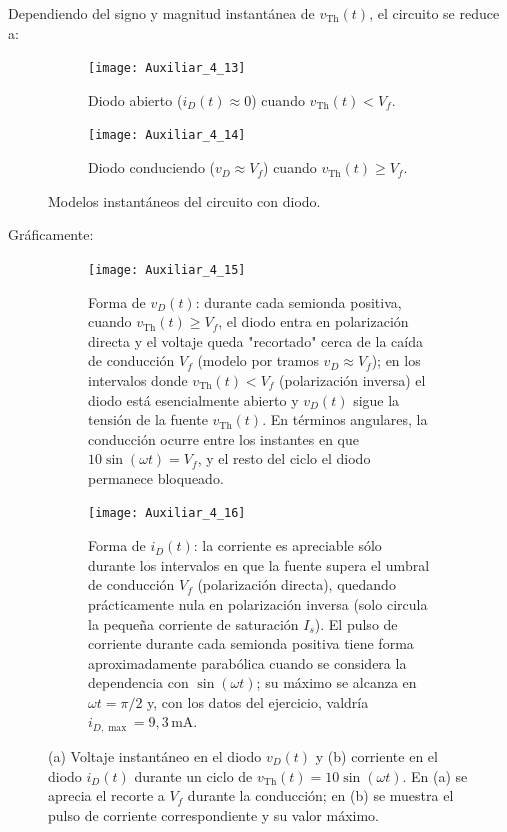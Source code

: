 \documentclass[
  11pt,
  letterpaper,
   addpoints,
   answers
  ]{exam}
\begin{document}
\begin{questions}
\begin{solution}
\noindent Dependiendo del signo y magnitud instantánea de $v_{\text{Th}}(t)$, el circuito se reduce a:
\begin{figure}[H]
  \centering
  \begin{subfigure}[b]{0.45\textwidth}
    \centering
    \texttt{[image: Auxiliar\_4\_13]}
    \caption{Diodo abierto ($i_D(t)\approx 0$) cuando $v_{\text{Th}}(t)<V_f$.}
    \label{fig:diodo-abierto}
  \end{subfigure}\hfill
  \begin{subfigure}[b]{0.4\textwidth}
    \centering
    \texttt{[image: Auxiliar\_4\_14]}
    \caption{Diodo conduciendo ($v_D\approx V_f$) cuando $v_{\text{Th}}(t)\ge V_f$.}
    \label{fig:diodo-conduce}
  \end{subfigure}
  \caption{Modelos instantáneos del circuito con diodo.}
  \label{fig:diodo-operacion-casos}
\end{figure}
Gráficamente:
\begin{figure}[H]
  \centering
  \begin{subfigure}[b]{0.48\textwidth}
    \centering
    \texttt{[image: Auxiliar\_4\_15]}
    \caption{Forma de $v_D(t)$: durante cada semionda positiva, cuando $v_{\text{Th}}(t)\ge V_f$, el diodo entra en polarización directa y el voltaje queda "recortado" cerca de la caída de conducción $V_f$ (modelo por tramos $v_D\approx V_f$); en los intervalos donde $v_{\text{Th}}(t)<V_f$ (polarización inversa) el diodo está esencialmente abierto y $v_D(t)$ sigue la tensión de la fuente $v_{\text{Th}}(t)$. En términos angulares, la conducción ocurre entre los instantes en que $10\sin(\omega t)=V_f$, y el resto del ciclo el diodo permanece bloqueado.}
    \label{fig:voltaje-corriente-diodo}
  \end{subfigure}\hfill
  \begin{subfigure}[b]{0.48\textwidth}
    \centering
    \texttt{[image: Auxiliar\_4\_16]}
    \caption{Forma de $i_D(t)$: la corriente es apreciable sólo durante los intervalos en que la fuente supera el umbral de conducción $V_f$ (polarización directa), quedando prácticamente nula en polarización inversa (solo circula la pequeña corriente de saturación $I_s$). El pulso de corriente durante cada semionda positiva tiene forma aproximadamente parabólica cuando se considera la dependencia con $\sin(\omega t)$; su máximo se alcanza en $\omega t=\pi/2$ y, con los datos del ejercicio, valdría $i_{D,\max}=9{,}3\,$mA.}
    \label{fig:voltaje-corriente-diodo-detalle}
  \end{subfigure}
  \caption{(a) Voltaje instantáneo en el diodo $v_D(t)$ y (b) corriente en el diodo $i_D(t)$ durante un ciclo de $v_{\text{Th}}(t)=10\sin(\omega t)$. En (a) se aprecia el recorte a $V_f$ durante la conducción; en (b) se muestra el pulso de corriente correspondiente y su valor máximo.}
  \label{fig:voltaje-corriente-diodo-combined}
\end{figure}


\end{solution}
\end{questions}
\end{document}
